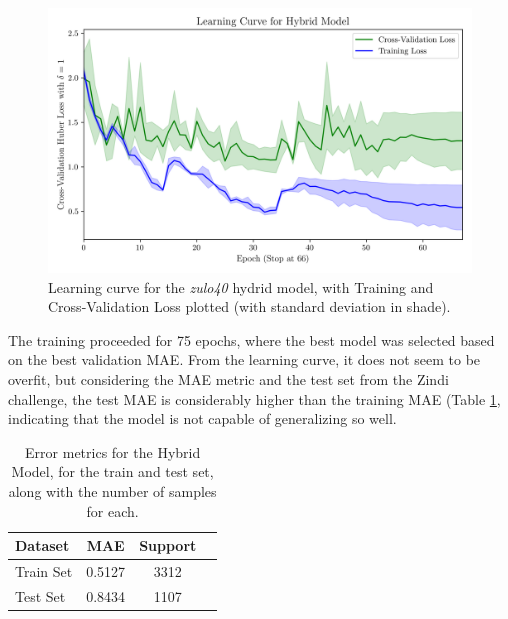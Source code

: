\documentclass[conference]{IEEEtran}
\begin{document}

\begin{figure}[H]
    \centering
    \includegraphics[width=1\linewidth]{assets/model01_lc.png}
    \caption{Learning curve for the \textit{zulo40} hydrid model, with Training and Cross-Validation Loss plotted (with standard deviation in shade).}
    \label{fig:model01_lc}
\end{figure}


The training proceeded for 75 epochs, where the best model was selected based on the best validation MAE. From the learning curve, it does not seem to be overfit, but considering the MAE metric and the test set from the Zindi challenge, the test MAE is considerably higher than the training MAE (Table \ref{tab:model01_results}, indicating that the model is not capable of generalizing so well.



\begin{table}[H]
\centering
\caption{Error metrics for the Hybrid Model, for the train and test set, along with the number of samples for each.}
\label{tab:model01_results}
\begin{tabular}{lccc}
\toprule
\textbf{Dataset} & \textbf{MAE} & \textbf{Support} \\
\midrule
Train Set & 0.5127 & 3312 \\
Test Set & 0.8434 & 1107 \\
\bottomrule
\end{tabular}
\end{table}
\end{document}
